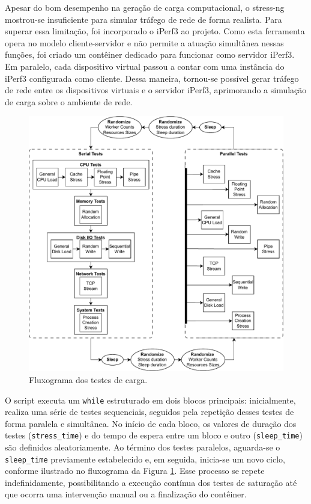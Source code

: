 Apesar do bom desempenho na geração de carga computacional, o stress-ng mostrou-se insuficiente para simular tráfego de rede de forma realista. Para superar essa limitação, foi incorporado o iPerf3 ao projeto. Como esta ferramenta opera no modelo cliente-servidor e não permite a atuação simultânea nessas funções, foi criado um contêiner dedicado para funcionar como servidor iPerf3. Em paralelo, cada dispositivo virtual passou a contar com uma instância do iPerf3 configurada como cliente. Dessa maneira, tornou-se possível gerar tráfego de rede entre os dispositivos virtuais e o servidor iPerf3, aprimorando a simulação de carga sobre o ambiente de rede.


\begin{figure}[H]
\centering
\includegraphics[scale=0.75]{Imagens/chap03/load_generator_flowchart2.pdf}
\caption{Fluxograma dos testes de carga.}
\label{fig:FluxogramaCarga}
\end{figure}



O script executa um  \verb|while| estruturado em dois blocos principais: inicialmente, realiza uma série de testes sequenciais, seguidos pela repetição desses testes de forma paralela e simultânea. No início de cada bloco, os valores de duração dos testes (\verb|stress_time|) e do tempo de espera entre um bloco e outro (\verb|sleep_time|) são definidos aleatoriamente. Ao término dos testes paralelos, aguarda-se o \verb|sleep_time| previamente estabelecido e, em seguida, inicia-se um novo ciclo, conforme ilustrado no fluxograma da Figura \ref{fig:FluxogramaCarga}. Esse processo se repete indefinidamente, possibilitando a execução contínua dos testes de saturação até que ocorra uma intervenção manual ou a finalização do contêiner.

